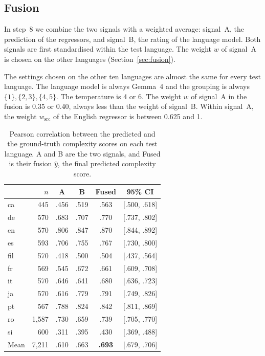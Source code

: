 \subsection{Fusion}
\label{sec:results-fusion}

In step~8 we combine the two signals with a weighted average: signal~A, the prediction of the %
regressors, and signal~B, the rating of the language model. Both signals are first standardised
within the test language. The weight $w$ of signal~A is chosen on the other languages
(Section~\ref{sec:fusion}).

The settings chosen on the other ten languages are almost the same for every test language. The %
language model is always Gemma~4 and the grouping is always $\{1\}, \{2, 3\}, \{4, 5\}$. The
temperature is 4 or 6. The weight $w$ of signal~A in the fusion is 0.35 or 0.40, always %
less than the weight of signal~B. Within signal~A, the weight $w_{\mathrm{src}}$ of the English %
regressor is between 0.625 and 1.

\begin{table}[t]
\centering
\small
\setlength{\tabcolsep}{4pt}
\begin{tabular}{lrcccc}
\toprule
 & $n$ & A & B & Fused & 95\% CI \\
\midrule
ca  &   445 & .456 & .519 & .563 & [.500, .618] \\ %
de  &   570 & .683 & .707 & .770 & [.737, .802] \\ %
en  &   570 & .806 & .847 & .870 & [.844, .892] \\ %
es  &   593 & .706 & .755 & .767 & [.730, .800] \\ %
fil &   570 & .418 & .500 & .504 & [.437, .564] \\ %
fr  &   569 & .545 & .672 & .661 & [.609, .708] \\ %
it  &   570 & .646 & .641 & .680 & [.636, .723] \\ %
ja  &   570 & .616 & .779 & .791 & [.749, .826] \\ %
pt  &   567 & .788 & .824 & .842 & [.811, .869] \\ %
ro  & 1{,}587 & .730 & .659 & .739 & [.705, .770] \\ %
si  &   600 & .311 & .395 & .430 & [.369, .488] \\ %
\midrule
Mean & 7{,}211 & .610 & .663 & \textbf{.693} & [.679, .706] \\ %
\bottomrule
\end{tabular}
\caption{Pearson correlation between the predicted and the ground-truth complexity scores on each
test language. A and B are the two signals, and Fused is their fusion $\hat{y}$, the final
predicted complexity score.}
\label{tab:per-language}
\end{table}

